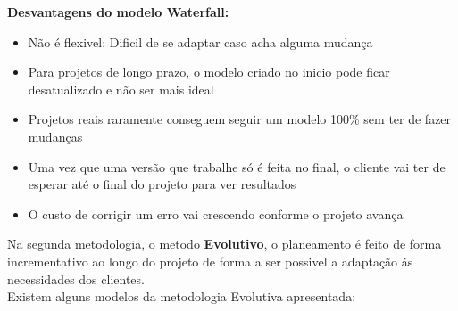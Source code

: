 \documentclass[a4paper, 12pt, onecolumn, oneside]{scrartcl}
\begin{document}
\textbf{Desvantagens do modelo Waterfall:}
\begin{itemize}
  \item Não é flexivel: Dificil de se adaptar caso acha alguma mudança
  \item Para projetos de longo prazo, o modelo criado no inicio pode ficar desatualizado e não ser mais ideal
  \item Projetos reais raramente conseguem seguir um modelo 100\% sem ter de fazer mudanças
  \item Uma vez que uma versão que trabalhe só é feita no final, o cliente vai ter de esperar até o final do projeto para ver resultados 
  \item O custo de corrigir um erro vai crescendo conforme o projeto avança\\
\end{itemize}
Na segunda metodologia, o metodo \textbf{Evolutivo}, o planeamento é feito de forma incrementativo ao longo do projeto de forma
a ser possivel a adaptação ás necessidades dos clientes.
\\Existem alguns modelos da metodologia Evolutiva apresentada:
\end{document}
